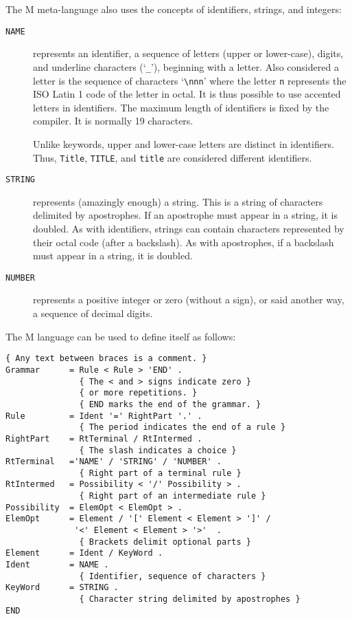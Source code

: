 The M meta-language also uses the concepts of identifiers, strings,
and integers:
\begin{description}
\item[{\tt NAME}] represents an identifier, a sequence of letters
(upper or lower-case), digits, and underline characters (`\verb|_|'),
beginning with a letter.  Also considered a letter is the sequence of
characters `{\verb|\nnn|}' where the letter {\tt n} represents the ISO
Latin 1 code of the letter in octal.  It is thus possible to use
accented letters in identifiers.  The maximum length of identifiers
is fixed by the compiler.  It is normally 19 characters.

Unlike keywords, upper and lower-case letters are distinct in
identifiers.  Thus, {\tt Title}, {\tt TITLE}, and {\tt title} are
considered different identifiers.

\item[{\tt STRING}] represents (amazingly enough) a string.  This is a
string of characters delimited by apostrophes.  If an apostrophe must
appear in a string, it is doubled.  As with identifiers, strings can
contain characters represented by their octal code (after a
backslash).  As with apostrophes, if a backslash must appear in a
string, it is doubled.

\item[{\tt NUMBER}] represents a positive integer or zero (without a
sign), or said another way, a sequence of decimal digits.
\end{description}

The M language can be used to define itself as follows:
\begin{verbatim}
{ Any text between braces is a comment. }
Grammar      = Rule < Rule > 'END' .
               { The < and > signs indicate zero }
               { or more repetitions. }
               { END marks the end of the grammar. }
Rule         = Ident '=' RightPart '.' .
               { The period indicates the end of a rule }
RightPart    = RtTerminal / RtIntermed .
               { The slash indicates a choice }
RtTerminal   ='NAME' / 'STRING' / 'NUMBER' .
               { Right part of a terminal rule }
RtIntermed   = Possibility < '/' Possibility > .
               { Right part of an intermediate rule }
Possibility  = ElemOpt < ElemOpt > .
ElemOpt      = Element / '[' Element < Element > ']' /
              '<' Element < Element > '>'  .
               { Brackets delimit optional parts }
Element      = Ident / KeyWord .
Ident        = NAME .
               { Identifier, sequence of characters }
KeyWord      = STRING .
               { Character string delimited by apostrophes }
END
\end{verbatim}

